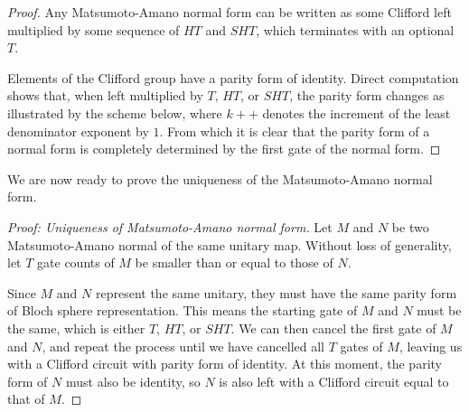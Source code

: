 \begin{proof}
	Any Matsumoto-Amano normal form can be written as some Clifford left multiplied by some sequence of $HT$ and $SHT$, which terminates with an optional $T$.

	Elements of the Clifford group have a parity form of identity. 
	Direct computation shows that, when left multiplied by $T$, $HT$, or $SHT$, the parity form changes as illustrated by the scheme below, where $k++$ denotes the increment of the least denominator exponent by $1$.
	From which it is clear that the parity form of a normal form is completely determined by the first gate of the normal form.

\end{proof}

We are now ready to prove the uniqueness of the Matsumoto-Amano normal form.

\begin{proof}[Proof: Uniqueness of Matsumoto-Amano normal form]
	Let $M$ and $N$ be two Matsumoto-Amano normal of the same unitary map.
	Without loss of generality, let $T$ gate counts of $M$ be smaller than or equal to those of $N$.

	Since $M$ and $N$ represent the same unitary, they must have the same parity form of Bloch sphere representation. This means the starting gate of $M$ and $N$ must be the same, which is either $T$, $HT$, or $SHT$.
	We can then cancel the first gate of $M$ and $N$, and repeat the
	process until we have cancelled all $T$ gates of $M$, leaving us with a Clifford circuit with parity form of identity.
	At this moment, the parity form of $N$ must also be identity, so $N$ is also left with a Clifford circuit equal to that of $M$.
\end{proof}

